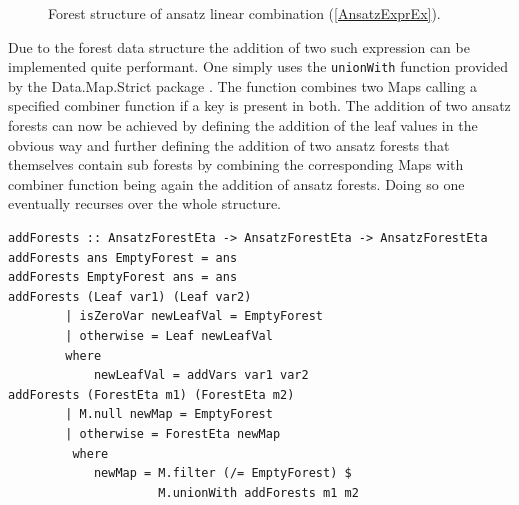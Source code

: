 \documentclass[a4paper,12pt, DIV=14, BCOR=5mm, twoside, headsepline]{scrbook}
\begin{document}
\begin{figure}
\caption{Forest structure of ansatz linear combination (\ref{AnsatzExprEx}). }
\label{AnsatzExprExForest}
\end{figure}

Due to the forest data structure the addition of two such expression can be implemented quite performant. One simply uses the \texttt{unionWith} function provided by the Data.Map.Strict package \cite{HackageMap}. The function combines two Maps calling a specified combiner function if a key is present in both. The addition of two ansatz forests can now be achieved by defining the addition of the leaf values in the obvious way and further defining the addition of two ansatz forests that themselves contain sub forests by combining the corresponding Maps with combiner function being again the addition of ansatz forests. Doing so one eventually recurses over the whole structure. 

\begin{samepage} 
\begin{verbatim}
addForests :: AnsatzForestEta -> AnsatzForestEta -> AnsatzForestEta
addForests ans EmptyForest = ans
addForests EmptyForest ans = ans
addForests (Leaf var1) (Leaf var2)
        | isZeroVar newLeafVal = EmptyForest
        | otherwise = Leaf newLeafVal
        where
            newLeafVal = addVars var1 var2
addForests (ForestEta m1) (ForestEta m2)
        | M.null newMap = EmptyForest
        | otherwise = ForestEta newMap
         where
            newMap = M.filter (/= EmptyForest) $
                     M.unionWith addForests m1 m2
\end{verbatim} 
\end{samepage}
\end{document}
